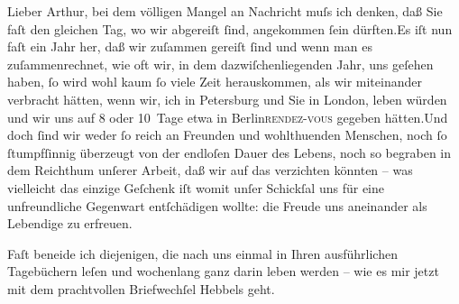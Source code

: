 \pstart{}Lieber Arthur,\pend\vspace{0.5em}
\pstart
           bei dem völligen Mangel an Nachricht muſs ich denken, daß Sie faſt den gleichen Tag,
               wo wir abgereiſt ſind, angekommen ſein dürften.\hspace*{1.5em}Es
               iſt nun faſt ein Jahr her, daß wir zuſammen gereiſt ſind und wenn man es
               zuſammenrechnet, wie oft wir, in dem dazwiſchenliegenden Jahr, uns geſehen haben, ſo
               wird wohl kaum ſo viele Zeit herauskommen, als wir miteinander verbracht hätten, wenn
               wir, ich in Petersburg und Sie in London, leben würden und wir uns auf 8 oder
               10 Tage etwa in Berlin\textsc{rendez-vous} gegeben hätten.\hspace*{1.5em}Und doch ſind wir weder ſo reich an Freunden und wohlthuenden Menschen, noch ſo
               ſtumpfſinnig überzeugt von der endloſen Dauer des Lebens, noch so begraben in dem
               Reichthum unſerer Arbeit, daß wir auf das verzichten {\pb}könnten – was vielleicht das
               einzige Geſchenk iſt womit unſer Schickſal uns für eine unfreundliche Gegenwart
               entſchädigen wollte: die Freude uns aneinander als Lebendige zu erfreuen.\pend
           
\pstart
           Faſt beneide ich diejenigen, die nach uns einmal in Ihren ausführlichen Tagebüchern
               leſen und wochenlang ganz darin leben werden – wie es mir jetzt mit dem prachtvollen
                  Briefwechſel Hebbels geht.\pend
           
